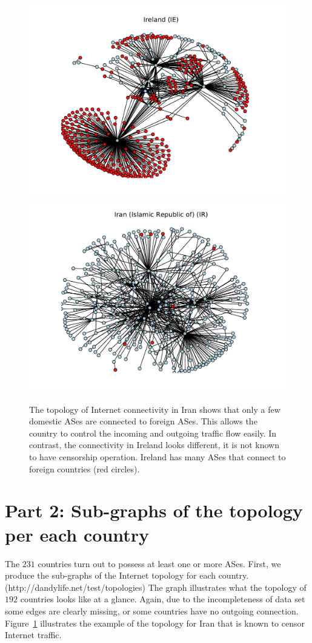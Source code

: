 \documentclass{article}
\begin{document}
\begin{figure}[h]

\includegraphics[width=0.8\linewidth]{IE.pdf}
\includegraphics[width=0.8\linewidth]{IR.pdf}
\caption{The topology of Internet connectivity in Iran shows that only a few 
domestic ASes are connected to foreign ASes. This allows the country to control
the incoming and outgoing traffic flow easily. In contrast, the connectivity in Ireland
looks different, it is not known to have censorship operation. Ireland has many ASes
that connect to foreign countries (red circles).}
\label{fig:topo_iran}
\end{figure}

\section*{Part 2: Sub-graphs of the topology per each country}

\bigskip

\noindent 
The $231$ countries turn out to possess at least one or more ASes. First, we
produce the sub-graphs of the Internet topology for each country.
(http://dandylife.net/test/topologies) The graph illustrates what the topology
of $192$ countries looks like at a glance. Again, due to the incompleteness of
data set some edges are clearly missing, or some countries have no outgoing
connection. Figure~\ref{fig:topo_iran} illustrates the example of the topology 
for Iran that is known to censor Internet traffic. 
\end{document}
